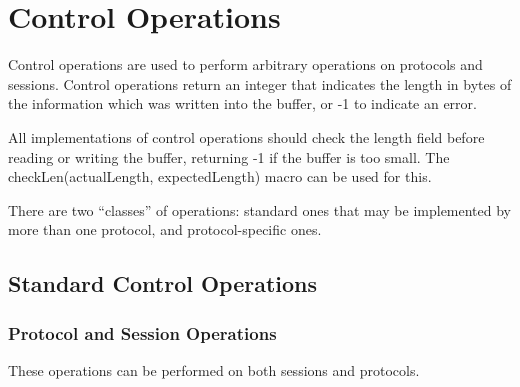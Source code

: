%
%

\section{ Control Operations }
\label{control}

Control operations are used to perform arbitrary operations on
protocols and sessions.  Control operations return an integer that
indicates the length in bytes of the information which was written
into the buffer, or -1 to indicate an error.

All implementations of control operations should check the length
field before reading or writing the buffer, returning -1 if the buffer
is too small.  The {\sanss checkLen(actualLength, expectedLength)}
macro can be used for this.

There are two ``classes'' of operations: standard ones that may be
implemented by more than one protocol, and protocol-specific ones.

\subsection{ Standard Control Operations }
\subsubsection{ Protocol and Session Operations }

These operations can be performed on both sessions and protocols.


